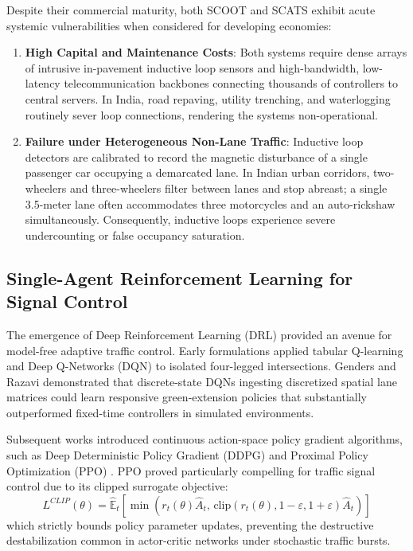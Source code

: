 Despite their commercial maturity, both SCOOT and SCATS exhibit acute systemic vulnerabilities when considered for developing economies:
\begin{enumerate}
    \item \textbf{High Capital and Maintenance Costs}: Both systems require dense arrays of intrusive in-pavement inductive loop sensors and high-bandwidth, low-latency telecommunication backbones connecting thousands of controllers to central servers. In India, road repaving, utility trenching, and waterlogging routinely sever loop connections, rendering the systems non-operational.
    \item \textbf{Failure under Heterogeneous Non-Lane Traffic}: Inductive loop detectors are calibrated to record the magnetic disturbance of a single passenger car occupying a demarcated lane. In Indian urban corridors, two-wheelers and three-wheelers filter between lanes and stop abreast; a single 3.5-meter lane often accommodates three motorcycles and an auto-rickshaw simultaneously. Consequently, inductive loops experience severe undercounting or false occupancy saturation.
\end{enumerate}

\subsection{Single-Agent Reinforcement Learning for Signal Control}
The emergence of Deep Reinforcement Learning (DRL) provided an avenue for model-free adaptive traffic control. Early formulations applied tabular Q-learning \cite{ref_abdulhai2003} and Deep Q-Networks (DQN) \cite{ref_oroojlooy2020} to isolated four-legged intersections. Genders and Razavi \cite{ref_genders2016} demonstrated that discrete-state DQNs ingesting discretized spatial lane matrices could learn responsive green-extension policies that substantially outperformed fixed-time controllers in simulated environments.

Subsequent works introduced continuous action-space policy gradient algorithms, such as Deep Deterministic Policy Gradient (DDPG) and Proximal Policy Optimization (PPO) \cite{ref_schulman2017}. PPO proved particularly compelling for traffic signal control due to its clipped surrogate objective:
\begin{equation}
L^{CLIP}(\theta) = \hat{\mathbb{E}}_t \left[ \min\left(r_t(\theta)\hat{A}_t, \, \text{clip}(r_t(\theta), 1-\varepsilon, 1+\varepsilon)\hat{A}_t\right) \right]
\end{equation}
which strictly bounds policy parameter updates, preventing the destructive destabilization common in actor-critic networks under stochastic traffic bursts.

